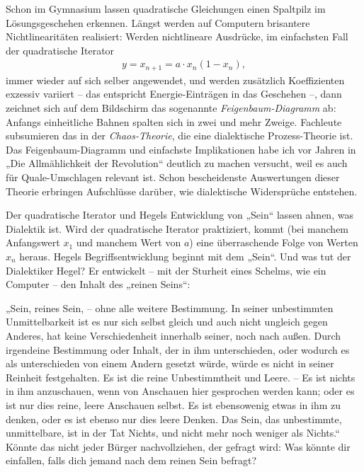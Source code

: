 \documentclass[11pt,a4paper]{article}
\begin{document}
Schon im Gymnasium lassen quadratische Gleichungen einen Spaltpilz im
Lösungsgeschehen erkennen. Längst werden auf Computern brisantere
Nichtlinearitäten realisiert: Werden nichtlineare Ausdrücke, im einfachsten
Fall der quadratische Iterator
\begin{gather*}
  y = x_{n+1} = a\cdot x_n (1-x_n),
\end{gather*}
immer wieder auf sich selber angewendet, und werden zusätzlich Koeffizienten
exzessiv variiert – das entspricht Energie-Einträgen in das Geschehen --, dann
zeichnet sich auf dem Bildschirm das sogenannte \emph{Feigenbaum-Diagramm} ab:
Anfangs einheitliche Bahnen spalten sich in zwei und mehr Zweige. Fachleute
subsumieren das in der \emph{Chaos-Theorie}, die eine dialektische
Prozess-Theorie ist. Das Feigenbaum-Diagramm und einfachste Implikationen habe
ich vor Jahren in „Die Allmählichkeit der Revolution“ deutlich zu machen
versucht, weil es auch für Quale-Umschlagen relevant ist. Schon bescheidenste
Auswertungen dieser Theorie erbringen Aufschlüsse darüber, wie dialektische
Widersprüche entstehen.

Der quadratische Iterator und Hegels Entwicklung von „Sein“ lassen ahnen, was
Dialektik ist. Wird der quadratische Iterator praktiziert, kommt (bei manchem
Anfangswert $x_1$ und manchem Wert von $a$) eine überraschende Folge von
Werten $x_n$ heraus. Hegels Begriffsentwicklung beginnt mit dem „Sein“. Und
was tut der Dialektiker Hegel? Er entwickelt – mit der Sturheit eines Schelms,
wie ein Computer – den Inhalt des „reinen Seins“:

„Sein, reines Sein, -- ohne alle weitere Bestimmung. In seiner unbestimmten
Unmittelbarkeit ist es nur sich selbst gleich und auch nicht ungleich gegen
Anderes, hat keine Verschiedenheit innerhalb seiner, noch nach außen. Durch
irgendeine Bestimmung oder Inhalt, der in ihm unterschieden, oder wodurch es
als unterschieden von einem Andern gesetzt würde, würde es nicht in seiner
Reinheit festgehalten. Es ist die reine Unbestimmtheit und Leere. – Es ist
nichts in ihm anzuschauen, wenn von Anschauen hier gesprochen werden kann;
oder es ist nur dies reine, leere Anschauen selbst. Es ist ebensowenig etwas
in ihm zu denken, oder es ist ebenso nur dies leere Denken. Das Sein, das
unbestimmte, unmittelbare, ist in der Tat Nichts, und nicht mehr noch weniger
als Nichts.“ Könnte das nicht jeder Bürger nachvollziehen, der gefragt wird:
Was könnte dir einfallen, falls dich jemand nach dem reinen Sein befragt?
\end{document}
